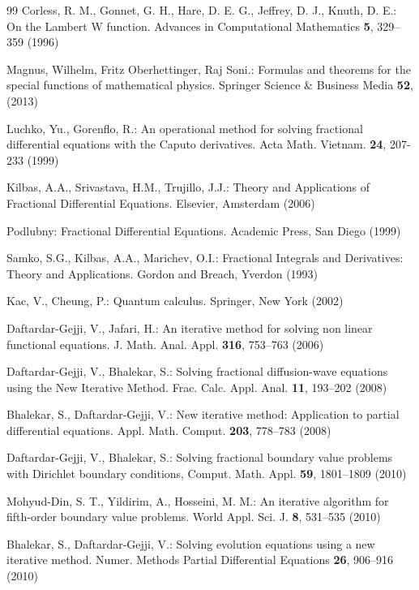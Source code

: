 \documentclass[12pt]{article}
\numberwithin{equation}{section}
\begin{document}
\begin{thebibliography}{99}
 Corless, R. M., Gonnet, G. H., Hare, D. E. G., Jeffrey, D. J., Knuth, D. E.: On the Lambert W function. Advances in Computational Mathematics \textbf{5}, 329--359 (1996)

 Magnus, Wilhelm, Fritz Oberhettinger, Raj Soni.: Formulas and theorems for the special functions of mathematical physics. Springer Science \& Business Media  \textbf{52}, (2013)

  Luchko, Yu., Gorenflo, R.: An operational method for solving fractional differential equations with the Caputo derivatives. Acta Math. Vietnam. \textbf{24}, 207-233 (1999)

  Kilbas, A.A.,  Srivastava, H.M., Trujillo, J.J.: Theory and Applications of Fractional Differential Equations. Elsevier, Amsterdam (2006)

 Podlubny: Fractional Differential Equations. Academic Press, San Diego (1999)

  Samko, S.G., Kilbas, A.A., Marichev, O.I.: Fractional Integrals and Derivatives: Theory and Applications. Gordon and Breach, Yverdon (1993)

  Kac, V., Cheung, P.: Quantum calculus. Springer, New York (2002)

 Daftardar-Gejji, V., Jafari, H.:  An iterative method for solving non linear functional equations. J. Math. Anal. Appl. \textbf{316}, 753--763  (2006)

  Daftardar-Gejji, V., Bhalekar,  S.:  Solving fractional diffusion-wave equations using the New Iterative Method. Frac. Calc. Appl. Anal. \textbf{11}, 193--202 (2008)

  Bhalekar, S., Daftardar-Gejji, V.: New iterative method: Application to partial differential equations. Appl. Math. Comput. \textbf{203}, 778--783 (2008)

  Daftardar-Gejji, V., Bhalekar,  S.: Solving fractional boundary value problems with Dirichlet boundary conditions, Comput. Math. Appl.  \textbf{59}, 1801--1809 (2010) 

  Mohyud-Din,  S. T.,  Yildirim, A., Hosseini,  M. M.:  An iterative algorithm for fifth-order boundary value problems. World Appl. Sci. J. \textbf{8}, 531--535 (2010)

 Bhalekar, S., Daftardar-Gejji, V.: Solving evolution equations using a new iterative method. Numer. Methods Partial Differential Equations \textbf{26},  906--916 (2010)


\end{thebibliography}
\end{document}
